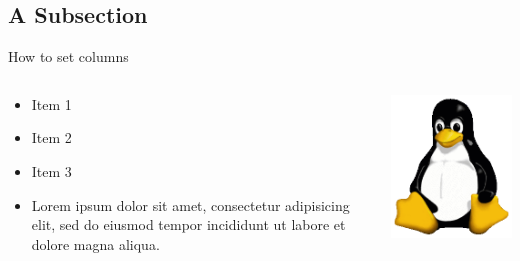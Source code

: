 \documentclass[10pt, aspectratio=1610]{beamer}
\begin{document}
\subsection{A Subsection}

\begin{frame}{How to set columns}
	\begin{columns}[T]
		\begin{column}{.40\textwidth}
			\begin{itemize}
				\item Item 1
				\item Item 2
				\item Item 3
				\item Lorem ipsum dolor sit amet, consectetur adipisicing elit, sed do eiusmod tempor incididunt ut labore et dolore magna aliqua. 
			\end{itemize}
		\end{column}
		\begin{column}{.40\textwidth}
			\includegraphics[width=.9\textwidth]{pictures/Tux}
		\end{column}
	\end{columns}
\end{frame}
\end{document}
